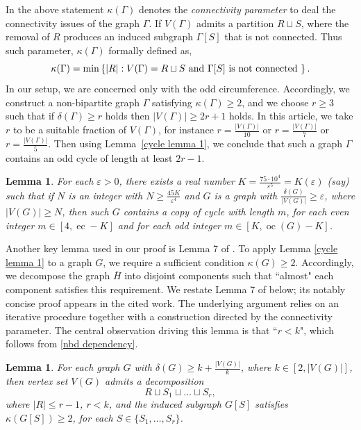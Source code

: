 \documentclass[reqno,10pt]{amsart}
\newtheorem{lemma}[theorem]{Lemma}
\theoremstyle{definition}
\begin{document}
\noindent In the above statement $\kappa(\Gamma)$ denotes the \emph{connectivity parameter} to deal the connectivity issues of the graph $\Gamma$. If $V(\Gamma)$ admits a partition $R\sqcup S$, where the removal of $R$ produces an induced subgraph $\Gamma[S]$ that is not connected. Thus such parameter, $\kappa(\Gamma)$ formally defined as,
\begin{equation*}
\kappa(\Gamma)=\min\left\{|R|: V(\Gamma)=R\sqcup S \textup{ and }\Gamma[S]\textup{  is not connected }\right\}.
\end{equation*}
In our setup, we are concerned only with the odd circumference. Accordingly, we construct a non-bipartite graph $\Gamma$ satisfying $\kappa(\Gamma)\geq2$, and we choose $r\geq3$  such that if $\delta(\Gamma)\geq r$ holds then $|V(\Gamma)|\geq2r+1$ holds. In this article, we take $r$ to be a suitable fraction of $V(\Gamma)$, for instance  $r=\frac{|V(\Gamma)|}{10}$ or $r=\frac{|V(\Gamma)|}{7}$ or $r=\frac{|V(\Gamma)|}{5}$. Then using Lemma~\ref{cycle lemma 1}, we conclude that such a graph $\Gamma$ contains an odd cycle of length at least $2r-1$.  


\begin{lemma}\label{cycle lemma 2}\cite[Theorem~1]{MR1939069}
For each $\varepsilon>0$, there exists a real number $K=\frac{75\cdot10^{4}}{\varepsilon^{5}}=K(\varepsilon)$ (say) such that if $N$ is an integer with $N\geq \frac{45K}{\varepsilon^{4}}$ and $G$ is a graph with $\frac{\delta(G)}{|V(G)|}\geq\varepsilon$, where $|V(G)|\geq N$, then such $G$ contains a copy of cycle with length $m$, for each even integer $m\in [4, \mathop{ec(G)}-K]$ and for each odd integer $m\in [K, \mathop{oc}(G)-K]$. 
\end{lemma}

Another key lemma used in our proof is Lemma 7 of \cite{MR4597476}. To apply Lemma \ref{cycle lemma 1} to a graph $G$, we require a sufficient condition $\kappa(G)\geq2$. Accordingly, we decompose the graph $\overline{H}$ into disjoint components such that ``almost" each component satisfies this requirement. We restate Lemma 7 of \cite{MR4597476} below; its notably concise proof appears in the cited work. The underlying argument relies on an iterative procedure together with a construction directed by the connectivity parameter. The central observation driving this lemma is that ``$r<k$", which follows from \eqref{nbd dependency}. 

\begin{lemma}\label{Star-cycle}
For each graph $G$ with $\delta(G)\geq k+\frac{|V(G)|}{k}$, where $k\in[2,|V(G)|]$, then vertex set $V(G)$ admits a decomposition 
\begin{equation*}
 R\sqcup S_{1}\sqcup\ldots\sqcup S_{r},   
\end{equation*}
where $|R|\leq r-1$, $r<k$, and the induced subgraph $G[S]$ satisfies $\kappa(G[S])\geq2$,  for each $S\in\{S_{1},\ldots,S_{r}\}$.
\end{lemma}
\end{document}
